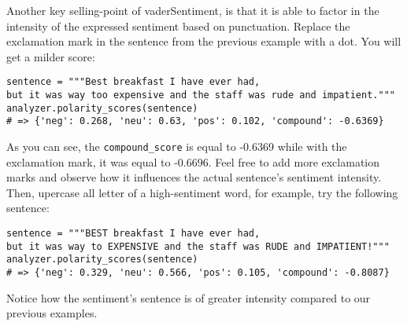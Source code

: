 	Another key selling-point of vaderSentiment, is that it is able to factor in the intensity of the expressed sentiment based on punctuation. Replace the exclamation mark in the sentence from the previous example with a dot. You will get a milder score:
	\begin{verbatim}
sentence = """Best breakfast I have ever had, 
but it was way too expensive and the staff was rude and impatient."""
analyzer.polarity_scores(sentence)
# => {'neg': 0.268, 'neu': 0.63, 'pos': 0.102, 'compound': -0.6369}
	\end{verbatim}
	As you can see, the \verb|compound_score| is equal to -0.6369 while with the exclamation mark, it was equal to -0.6696. Feel free to add more exclamation marks and observe how it influences the actual sentence's sentiment intensity. Then, upercase all letter of a high-sentiment word, for example, try the following sentence: 
	\begin{Verbatim}
sentence = """BEST breakfast I have ever had, 
but it was way to EXPENSIVE and the staff was RUDE and IMPATIENT!"""
analyzer.polarity_scores(sentence)
# => {'neg': 0.329, 'neu': 0.566, 'pos': 0.105, 'compound': -0.8087}
	\end{Verbatim}
	Notice how the sentiment's sentence is of greater intensity compared to our previous examples.
	
